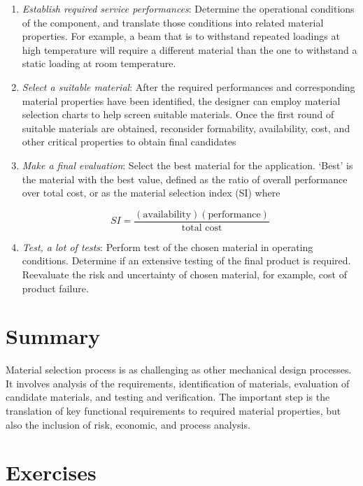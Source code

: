 \documentclass[
10pt,
a4paper,
openany,
svgnames,
]{book}
\begin{document}
\begin{enumerate}

\item \emph{Establish required service performances}: Determine the operational conditions of the component, and translate those conditions into related material properties. For example, a beam that is to withstand repeated loadings at high temperature will require a different material than the one to withstand a static loading at room temperature.

\item \emph{Select a suitable material}: After the required performances and corresponding material properties have been identified, the designer can employ material selection charts to help screen suitable materials. Once the first round of suitable materials are obtained, reconsider formability, availability, cost, and other critical properties to obtain final candidates

\item \emph{Make a final evaluation}: Select the best material for the application. ‘Best’ is the material with the best value, defined as the ratio of overall performance over total cost, or as the material selection index (SI) where

  $$ SI = \frac{(\text{availability})(\text{performance})}{\text{total cost}} $$

\item \emph{Test, a lot of tests}: Perform test of the chosen material in operating conditions. Determine if an extensive testing of the final product is required. Reevaluate the risk and uncertainty of chosen material, for example, cost of product failure.

\end{enumerate}

\section*{Summary}

Material selection process is as challenging as other mechanical design processes. It involves analysis of the requirements, identification of materials, evaluation of candidate materials, and testing and verification. The important step is the translation of key functional requirements to required material properties, but also the inclusion of risk, economic, and process analysis.

\section*{Exercises}
\end{document}
